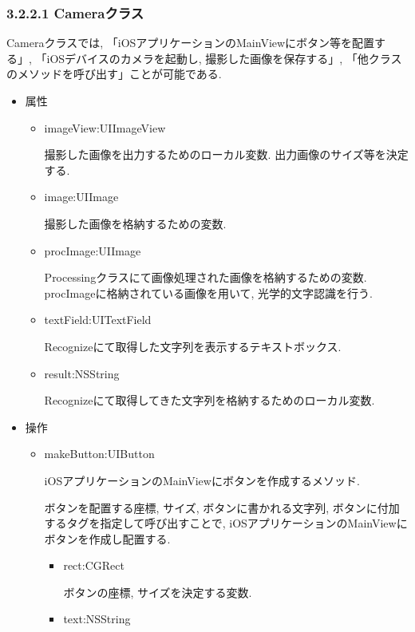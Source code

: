 \subsubsection{3.2.2.1 Cameraクラス}
Cameraクラスでは, 「iOSアプリケーションのMainViewにボタン等を配置する」, 「iOSデバイスのカメラを起動し, 撮影した画像を保存する」, 「他クラスのメソッドを呼び出す」ことが可能である.

\begin{itemize}
\item 属性

\begin{itemize}
\item imageView:UIImageView

撮影した画像を出力するためのローカル変数.
出力画像のサイズ等を決定する.

\item image:UIImage

撮影した画像を格納するための変数.

\item procImage:UIImage

Processingクラスにて画像処理された画像を格納するための変数.
procImageに格納されている画像を用いて, 光学的文字認識を行う.

\item textField:UITextField

Recognizeにて取得した文字列を表示するテキストボックス.

\item result:NSString

Recognizeにて取得してきた文字列を格納するためのローカル変数.
\end{itemize}

\item 操作

\begin{itemize}
\item makeButton:UIButton

iOSアプリケーションのMainViewにボタンを作成するメソッド.

ボタンを配置する座標, サイズ, ボタンに書かれる文字列, ボタンに付加するタグを指定して呼び出すことで, iOSアプリケーションのMainViewにボタンを作成し配置する.

\begin{itemize}
\item rect:CGRect

ボタンの座標, サイズを決定する変数.

\item text:NSString


\end{itemize}
\end{itemize}
\end{itemize}
